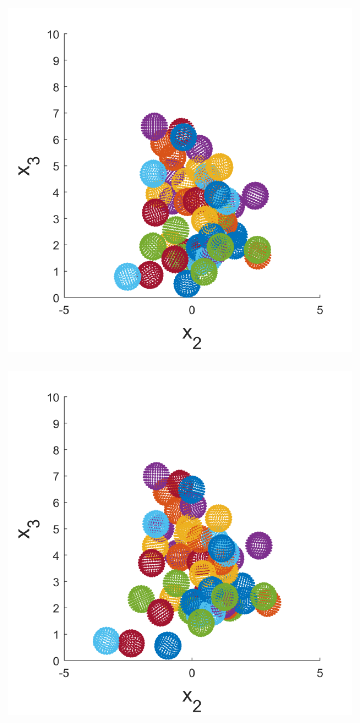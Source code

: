 \begin{figure}
\begin{subfigure}[b]{0.24\textwidth}
    \caption[]{\label{fig:squirmerPosB}}
\end{subfigure}
\begin{subfigure}[b]{0.24\textwidth}
    \centering
    \includegraphics[width=\textwidth]{Images/squirmers/Gyro-3-All.pdf}
    \caption[]{\label{fig:squirmerPosC}}
\end{subfigure}
\begin{subfigure}[b]{0.24\textwidth}
    \centering
    \includegraphics[width=\textwidth]{Images/squirmers/Gyro-4-All.pdf}

\end{subfigure}
\end{figure}

